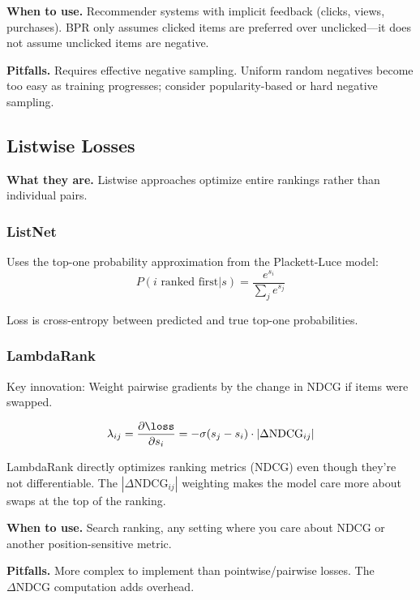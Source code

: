 \textbf{When to use.} Recommender systems with implicit feedback (clicks, views, purchases). BPR only assumes clicked items are preferred over unclicked---it does not assume unclicked items are negative.

\textbf{Pitfalls.} Requires effective negative sampling. Uniform random negatives become too easy as training progresses; consider popularity-based or hard negative sampling.

\subsection{Listwise Losses}

\textbf{What they are.} Listwise approaches optimize entire rankings rather than individual pairs.

\subsubsection{ListNet}

Uses the top-one probability approximation from the Plackett-Luce model:
\begin{equation}
P(i \text{ ranked first} | s) = \frac{e^{s_i}}{\sum_j e^{s_j}}
\end{equation}

Loss is cross-entropy between predicted and true top-one probabilities.

\subsubsection{LambdaRank}

Key innovation: Weight pairwise gradients by the change in NDCG if items were swapped.

\begin{equation}
\lambda_{ij} = \frac{\partial \loss}{\partial s_i} = -\sigma(s_j - s_i) \cdot |\Delta\text{NDCG}_{ij}|
\end{equation}

\begin{keyinsight}
LambdaRank directly optimizes ranking metrics (NDCG) even though they're not differentiable. The $|\Delta\text{NDCG}_{ij}|$ weighting makes the model care more about swaps at the top of the ranking.
\end{keyinsight}

\textbf{When to use.} Search ranking, any setting where you care about NDCG or another position-sensitive metric.

\textbf{Pitfalls.} More complex to implement than pointwise/pairwise losses. The $\Delta\text{NDCG}$ computation adds overhead.

